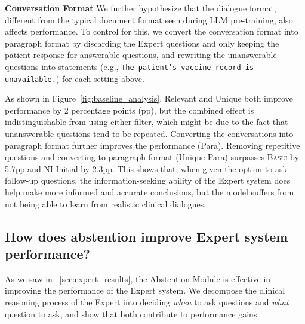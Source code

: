 \documentclass{article}
\newcommand{\Sref}[1]{\textsection~\ref{#1}}
\newcommand{\Fref}[1]{Figure~\ref{#1}}
\begin{document}
\textbf{Conversation Format}\hspace{3mm}
We further hypothesize that the dialogue format, different from the typical document format seen during LLM pre-training, also affects performance. To control for this, we convert the conversation format into paragraph format by discarding the Expert questions and only keeping the patient response for answerable questions, and rewriting the unanswerable questions into statements (e.g., \texttt{The patient's vaccine record is unavailable.}) for each setting above.



As shown in \Fref{fig:baseline_analysis}, Relevant and Unique both improve performance by 2 percentage points (pp), but the combined effect is indistinguishable from using either filter, which might be due to the fact that unanswerable questions tend to be repeated.
Converting the conversations into paragraph format further improves the performance (Para).
Removing repetitive questions and converting to paragraph format (Unique-Para) surpasses \textsc{Basic} by 5.7pp and NI-Initial by 2.3pp.
This shows that, when given the option to ask follow-up questions, the information-seeking ability of the Expert system does help make more informed and accurate conclusions, but the model suffers from not being able to learn from realistic clinical dialogues.


\subsection{How does abstention improve Expert system performance?}\label{sec:analysis:abstain}
As we saw in \Sref{sec:expert_results}, the Abstention Module is effective in improving the performance of the Expert system. 
We decompose the clinical reasoning process of the Expert into deciding \emph{when} to ask questions and \emph{what} question to ask, and show that both contribute to performance gains.%
\end{document}
